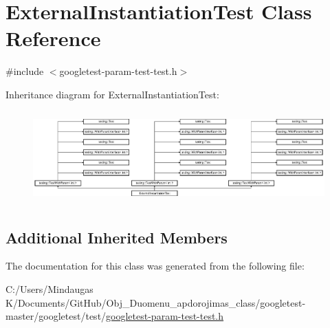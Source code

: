 \hypertarget{class_external_instantiation_test}{}\section{External\+Instantiation\+Test Class Reference}
\label{class_external_instantiation_test}


{\ttfamily \#include $<$googletest-\/param-\/test-\/test.\+h$>$}

Inheritance diagram for External\+Instantiation\+Test\+:\begin{figure}[H]
\begin{center}
\leavevmode
\includegraphics[height=3.572568cm]{d3/d47/class_external_instantiation_test}
\end{center}
\end{figure}
\subsection*{Additional Inherited Members}


The documentation for this class was generated from the following file\+:\begin{DoxyCompactItemize}
\item 
C\+:/\+Users/\+Mindaugas K/\+Documents/\+Git\+Hub/\+Obj\+\_\+\+Duomenu\+\_\+apdorojimas\+\_\+class/googletest-\/master/googletest/test/\mbox{\hyperlink{googletest-master_2googletest_2test_2googletest-param-test-test_8h}{googletest-\/param-\/test-\/test.\+h}}\end{DoxyCompactItemize}
